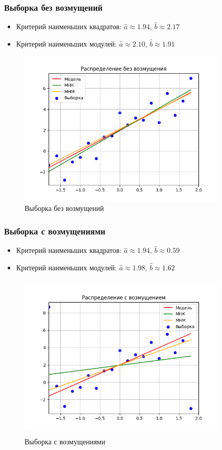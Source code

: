 \documentclass[../main.tex]{subfiles}
\begin{document}
    \subsubsection{Выборка без возмущений}
		\begin{itemize}
			\item{Критерий наименьших квадратов:}
			$\hat{a}\approx 1.94$, $\hat{b}\approx 2.17$
			\item{Критерий наименьших модулей:}
			$\hat{a}\approx 2.10$, $\hat{b}\approx 1.91$
		\end{itemize}
		\begin{figure}[H]
			\centering
			\includegraphics[width = 10cm, height 8cm]{figures/noDisturbance.png}
			\caption{Выборка без возмущений}
			\label{w/o_pert}
		\end{figure}
	
	\subsubsection{Выборка с возмущениями}
		\begin{itemize}
			\item{Критерий наименьших квадратов:}
			$\hat{a}\approx 1.94$, $\hat{b}\approx 0.59$
			\item{Критерий наименьших модулей:}
			$\hat{a}\approx 1.98$, $\hat{b}\approx 1.62$
		\end{itemize}
		\begin{figure}[H]
			\centering
			\includegraphics[width = 10cm, height = 8cm]{figures/Disturbance.png}
			\caption{Выборка с возмущениями}
			\label{w_pert}
		\end{figure}
		
\end{document}
